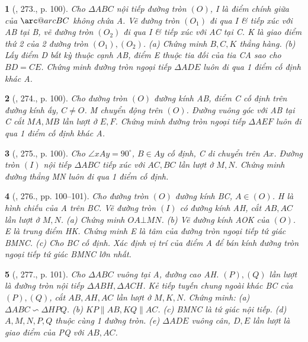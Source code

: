\documentclass{article}
\makeatletter
\newcommand{\arc@char}{{\usefont{U}{tipa}{m}{n}\symbol{62}}}%
\newcommand{\arc}[1]{\mathpalette\arc@arc{#1}}
\newcommand{\arc@arc}[2]{%
	\sbox0{$\m@th#1#2$}%
	\vbox{
		\hbox{\resizebox{\wd0}{\height}{\arc@char}}
		\nointerlineskip
		\box0
	}%
}
\newtheorem{baitoan}{}
\makeatother
\begin{document}
\begin{baitoan}[\cite{Binh_Toan_9_tap_2}, 273., p. 100]
	Cho $\Delta ABC$ nội tiếp đường tròn $(O)$, I là điểm chính giữa của $\arc{BC}$ không chứa A. Vẽ đường tròn $(O_1)$ đi qua I \& tiếp xúc với AB tại B, vẽ đường tròn $(O_2)$ đi qua I \& tiếp xúc với AC tại C. K là giao điểm thứ 2 của 2 đường tròn $(O_1),(O_2)$. (a) Chứng minh $B,C,K$ thẳng hàng. (b) Lấy điểm D bất kỳ thuộc cạnh AB, điểm E thuộc tia đối của tia CA sao cho $BD = CE$. Chứng minh đường tròn ngoại tiếp $\Delta ADE$ luôn đi qua 1 điểm cố định khác A.
\end{baitoan}

\begin{baitoan}[\cite{Binh_Toan_9_tap_2}, 274., p. 100]
	Cho đường tròn $(O)$ đường kính AB, điểm C cố định trên đường kính ấy, $C\ne O$. M chuyển động trên $(O)$. Đường vuông góc với AB tại C cắt $MA,MB$ lần lượt ở $E,F$. Chứng minh đường tròn ngoại tiếp $\Delta AEF$ luôn đi qua 1 điểm cố định khác A.
\end{baitoan}

\begin{baitoan}[\cite{Binh_Toan_9_tap_2}, 275., p. 100]
	Cho $\angle{xAy} = 90^\circ$, $B\in Ay$ cố định, C di chuyển trên $Ax$. Đường tròn $(I)$ nội tiếp $\Delta ABC$ tiếp xúc với $AC,BC$ lần lượt ở $M,N$. Chứng minh đường thẳng MN luôn đi qua 1 điểm cố định.
\end{baitoan}

\begin{baitoan}[\cite{Binh_Toan_9_tap_2}, 276., pp. 100--101]
	Cho đường tròn $(O)$ đường kính BC, $A\in(O)$. H là hình chiếu của A trên BC. Vẽ đường tròn $(I)$ có đường kính AH, cắt $AB,AC$ lần lượt ở $M,N$. (a) Chứng minh $OA\bot MN$. (b) Vẽ đường kính AOK của $(O)$. E là trung điểm HK. Chứng minh E là tâm của đường tròn ngoại tiếp tứ giác BMNC. (c) Cho BC cố định. Xác định vị trí của điểm A để bán kính đường tròn ngoại tiếp tứ giác BMNC lớn nhất.
\end{baitoan}

\begin{baitoan}[\cite{Binh_Toan_9_tap_2}, 277., p. 101]
	Cho $\Delta ABC$ vuông tại A, đường cao AH. $(P),(Q)$ lần lượt là đường tròn nội tiếp $\Delta ABH,\Delta ACH$. Kẻ tiếp tuyến chung ngoài khác BC của $(P),(Q)$, cắt $AB,AH,AC$ lần lượt ở $M,K,N$. Chứng minh: (a) $\Delta ABC\backsim\Delta HPQ$. (b) $KP\parallel AB,KQ\parallel AC$. (c) BMNC là tứ giác nội tiếp. (d) $A,M,N,P,Q$ thuộc cùng 1 đường tròn. (e) $\Delta ADE$ vuông cân, $D,E$ lần lượt là giao điểm của PQ với $AB,AC$.
\end{baitoan}
\end{document}
